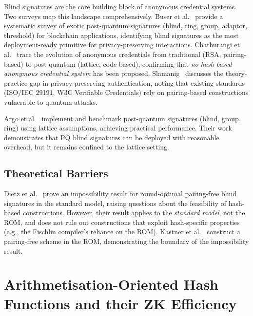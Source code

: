 \documentclass[11pt,a4paper]{article}
\newcommand{\ROM}{\textsf{ROM}}
\begin{document}
Blind signatures are the core building block of anonymous credential systems.  Two surveys
map this landscape comprehensively.  Buser et al.~\cite{Buser2022ExoticSigs} provide a
systematic survey of exotic post-quantum signatures (blind, ring, group, adaptor, threshold)
for blockchain applications, identifying blind signatures as the most deployment-ready primitive
for privacy-preserving interactions.  Chathurangi et al.~\cite{Chathurangi2025Advances} trace
the evolution of anonymous credentials from traditional (RSA, pairing-based) to post-quantum
(lattice, code-based), confirming that \emph{no hash-based anonymous credential system} has
been proposed.  Slamanig~\cite{Slamanig2025PrivacyAuth} discusses the theory-practice gap in
privacy-preserving authentication, noting that existing standards (ISO/IEC 29191, W3C Verifiable
Credentials) rely on pairing-based constructions vulnerable to quantum attacks.

Argo et al.~\cite{Argo2024PracticalPQ} implement and benchmark post-quantum signatures (blind,
group, ring) using lattice assumptions, achieving practical performance.  Their work demonstrates
that PQ blind signatures can be deployed with reasonable overhead, but it remains confined to
the lattice setting.

\subsection{Theoretical Barriers}

Dietz et al.~\cite{Dietz2026Impossibility} prove an impossibility result for round-optimal
pairing-free blind signatures in the standard model, raising questions about the feasibility of
hash-based constructions.  However, their result applies to the \emph{standard model},
not the \ROM, and does not rule out constructions that exploit hash-specific properties
(e.g., the Fischlin compiler's reliance on the \ROM).  Kastner et al.~\cite{Kastner2024PairingFree}
construct a pairing-free scheme in the \ROM, demonstrating the boundary of the impossibility
result.

\section{Arithmetisation-Oriented Hash Functions and their ZK Efficiency}
\label{sec:zkmapping}
\end{document}
